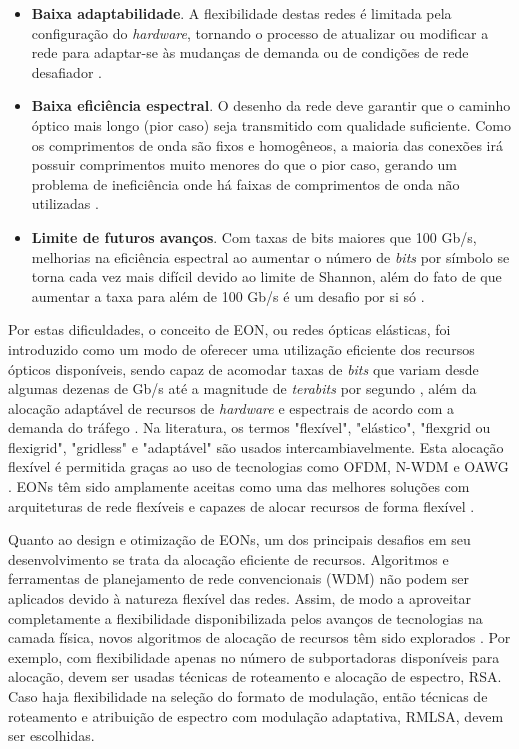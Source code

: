 \begin{itemize}
  \item \textbf{Baixa adaptabilidade}. A flexibilidade destas redes é limitada pela configuração do \textit{hardware}, tornando o processo de atualizar ou modificar a rede para adaptar-se às mudanças de demanda ou de condições de rede desafiador \cite{eon_tutorial_2014}.
  \item \textbf{Baixa eficiência espectral}. O desenho da rede deve garantir que o caminho óptico mais longo (pior caso) seja transmitido com qualidade suficiente. Como os comprimentos de onda são fixos e homogêneos, a maioria das conexões irá possuir comprimentos muito menores do que o pior caso, gerando um problema de ineficiência onde há faixas de comprimentos de onda não utilizadas \cite{jinno_eon_benefits,vizcaino_eon_energy}.
  \item \textbf{Limite de futuros avanços}. Com taxas de bits maiores que 100 Gb/s, melhorias na eficiência espectral ao aumentar o número de \textit{bits} por símbolo se torna cada vez mais difícil devido ao limite de Shannon, além do fato de que aumentar a taxa para além de 100 Gb/s é um desafio por si só \cite{jinno_eon_benefits}.
\end{itemize}

Por estas dificuldades, o conceito de \acrfull{EON}, ou redes ópticas elásticas, foi introduzido como um modo de oferecer uma utilização eficiente dos recursos ópticos disponíveis, sendo capaz de acomodar taxas de \textit{bits} que variam desde algumas dezenas de Gb/s até a magnitude de \textit{terabits} por segundo \cite{eon_tutorial_2014, eon_survey_2012}, além da alocação adaptável de recursos de \textit{hardware} e espectrais de acordo com a demanda do tráfego \cite{jinno_eon_benefits}. Na literatura, os termos "flexível", "elástico", "flexgrid ou flexigrid", "gridless" e "adaptável" são usados intercambiavelmente. Esta alocação flexível é permitida graças ao uso de tecnologias como \acrfull{OFDM}, \acrfull{N-WDM} e \acrfull{OAWG} \cite{eon_tutorial_2014}. EONs têm sido amplamente aceitas como uma das melhores soluções com arquiteturas de rede flexíveis e capazes de alocar recursos de forma flexível \cite{eon_ml_rsa_dl_2019}.

Quanto ao design e otimização de \acrfull{EONs}, um dos principais desafios em seu desenvolvimento se trata da alocação eficiente de recursos. Algoritmos e ferramentas de planejamento de rede convencionais (WDM) não podem ser aplicados devido à natureza flexível das redes. Assim, de modo a aproveitar completamente a flexibilidade disponibilizada pelos avanços de tecnologias na camada física, novos algoritmos de alocação de recursos têm sido explorados \cite{eon_tutorial_2014, eon_allocation_2011, eon_allocation_2011_2, eon_allocation_2016, eon_allocation_2017}. Por exemplo, com flexibilidade apenas no número de subportadoras disponíveis para alocação, devem ser usadas técnicas de roteamento e alocação de espectro, \acrfull{RSA}. Caso haja flexibilidade na seleção do formato de modulação, então técnicas de roteamento e atribuição de espectro com modulação adaptativa, \acrfull{RMLSA}, devem ser escolhidas.


